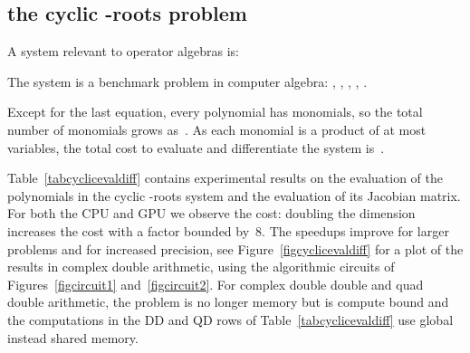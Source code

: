 \documentclass{article}
\begin{document}
\newpage
\subsection{the cyclic -roots problem}

A system relevant to operator algebras is:


The system is a benchmark problem in computer algebra:
\cite{AV13}, \cite{BF94}, \cite{DKK03}, \cite{Fau01}, \cite{Sab11}.

Except for the last equation, every polynomial has  monomials,
so the total number of monomials grows as~.
As each monomial is a product of at most  variables,
the total cost to evaluate and differentiate the system is~.

Table~\ref{tabcyclicevaldiff}
contains experimental results on the
evaluation of the polynomials in the cyclic -roots system and
the evaluation of its Jacobian matrix.
For both the CPU and GPU we observe the  cost:
doubling the dimension increases the cost with a factor bounded by~8.
The speedups improve for larger problems and for increased precision,
see Figure~\ref{figcyclicevaldiff} for a plot of the results
in complex double arithmetic, using the algorithmic circuits
of Figures~\ref{figcircuit1} and~\ref{figcircuit2}.
For complex double double and quad double arithmetic,
the problem is no longer memory but is compute bound
and the computations in the DD and QD rows of 
Table~\ref{tabcyclicevaldiff} use global instead shared memory.
\end{document}
